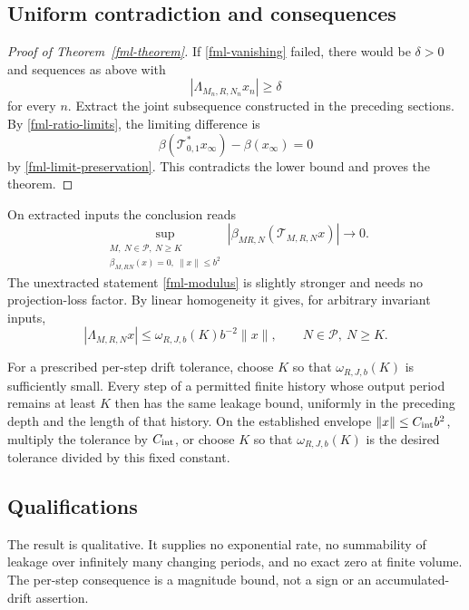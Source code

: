 \subsection{Uniform contradiction and consequences}
\label{fml-proof-section}

\begin{proof}[Proof of Theorem~\ref{fml-theorem}]
If \eqref{fml-vanishing} failed, there would be
\(\delta>0\) and sequences as above with
\[
                     |\Lambda_{M_n,R,N_n}x_n|\ge\delta
\]
for every \(n\). Extract the joint subsequence constructed
in the preceding sections. By \eqref{fml-ratio-limits},
the limiting difference is
\[
 \beta(\mathcal T_{0,1}^*x_\infty)-\beta(x_\infty)=0
\]
by \eqref{fml-limit-preservation}. This contradicts the
lower bound and proves the theorem.
\end{proof}

On extracted inputs the conclusion reads
\begin{equation}
 \sup_{\substack{M,\ N\in\mathcal P,\ N\ge K\\
           \beta_{M,RN}(x)=0,\ \|x\|\le b^2}}
       |\beta_{MR,N}(\mathcal T_{M,R,N}x)|
                            \longrightarrow0.
 \label{fml-extracted-conclusion}
\end{equation}
The unextracted statement \eqref{fml-modulus} is slightly
stronger and needs no projection-loss factor. By linear
homogeneity it gives, for arbitrary invariant inputs,
\begin{equation}
 |\Lambda_{M,R,N}x|
       \le \omega_{R,J,b}(K)b^{-2}\|x\|,
       \qquad N\in\mathcal P,\ N\ge K.
 \label{fml-scaled-bound}
\end{equation}

For a prescribed per-step drift tolerance, choose \(K\)
so that \(\omega_{R,J,b}(K)\) is sufficiently small.
Every step of a permitted finite history whose output
period remains at least \(K\) then has the same leakage
bound, uniformly in the preceding depth and the length
of that history. On the established envelope
\(\|x\|\le C_{\rm int}b^2\), multiply the tolerance by
\(C_{\rm int}\), or choose \(K\) so that
\(\omega_{R,J,b}(K)\) is the desired tolerance divided
by this fixed constant.

\subsection{Qualifications}
\label{fml-scope-section}

The result is qualitative. It supplies no exponential
rate, no summability of leakage over infinitely many
changing periods, and no exact zero at finite volume.
The per-step consequence is a magnitude bound, not a
sign or an accumulated-drift assertion.

